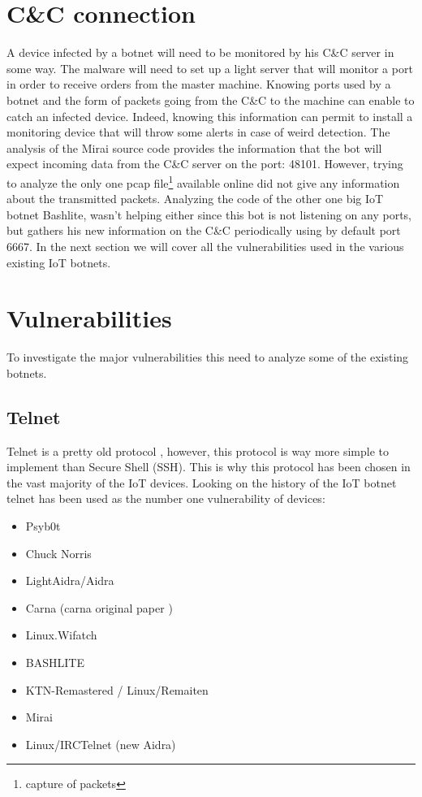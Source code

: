 \documentclass{report}
\begin{document}
\section{C\&C connection}
A device infected by a botnet will need to be monitored by his C\&C server in some way. The malware will need to set up a light server that will monitor a port in order to receive orders from the master machine. Knowing ports used by a botnet and the form of packets going from the C\&C to the machine can enable to catch an infected device. Indeed, knowing this information can permit to install a monitoring device that will throw some alerts in case of weird detection.\newline
The analysis of the Mirai source code provides the information that the bot will expect incoming data from the C\&C server on the port: 48101.
However, trying to analyze the only one pcap file\footnote{capture of packets} available online did not give any information about the transmitted packets.
Analyzing the code of the other one big IoT botnet Bashlite, wasn't helping either since this bot is not listening on any ports, but gathers his new information on the C\&C periodically using by default port 6667.\newline
In the next section we will cover all the vulnerabilities used in the various existing IoT botnets.

\section{Vulnerabilities}
\label{sec:vulnerabilities}
To investigate the major vulnerabilities this need to analyze some of the existing botnets.

\subsection{Telnet}
Telnet is a pretty old protocol \autocite{davidson1977arpanet}, however, this protocol is way more simple to implement than Secure Shell (SSH). This is why this protocol has been chosen in the vast majority of the IoT devices. Looking on the history of the IoT botnet telnet has been used as the number one vulnerability of devices:

\begin{itemize}
 \item Psyb0t \autocite{durfina2013psybot}
 \item Chuck Norris \autocite{celeda2010embedded}
 \item LightAidra/Aidra \autocite{aidra}
 \item Carna \autocite{krenc2014internet} (carna original paper \autocite{carna})
 \item Linux.Wifatch \autocite{wifatch}
 \item BASHLITE \autocite{bashlite}
 \item KTN-Remastered / Linux/Remaiten \autocite{remaiten}
 \item Mirai \autocite{kolias2017ddos}
 \item Linux/IRCTelnet (new Aidra) \autocite{irctelnet}
\end{itemize}
\end{document}
